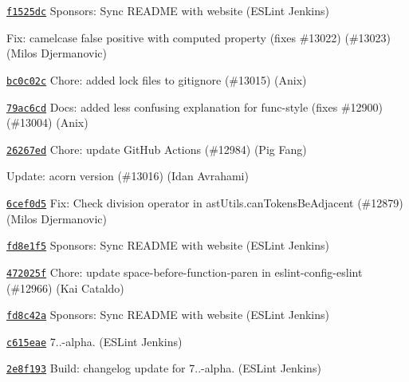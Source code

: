 \begin{DoxyItemize}
\item \href{https://github.com/eslint/eslint/commit/f1525dc45dfdbbe31e724671270785b41cffc6bd}{\texttt{ {\ttfamily f1525dc}}} Sponsors\+: Sync README with website (ESLint Jenkins)
\item \href{https://github.com/eslint/eslint/commit/0243549db4d237cb78e720d55a9cae89b91f6830}{\texttt{ {}}} Fix\+: camelcase false positive with computed property (fixes \#13022) (\#13023) (Milos Djermanovic)
\item \href{https://github.com/eslint/eslint/commit/bc0c02cd0368559c7a7b1510eb4620022a4cc31c}{\texttt{ {\ttfamily bc0c02c}}} Chore\+: added lock files to gitignore (\#13015) (Anix)
\item \href{https://github.com/eslint/eslint/commit/79ac6cd2d8e4c32e03dfea10a957806845058573}{\texttt{ {\ttfamily 79ac6cd}}} Docs\+: added less confusing explanation for func-\/style (fixes \#12900) (\#13004) (Anix)
\item \href{https://github.com/eslint/eslint/commit/26267ed70270ef746b785c09e267f815bf7c596a}{\texttt{ {\ttfamily 26267ed}}} Chore\+: update Git\+Hub Actions (\#12984) (Pig Fang)
\item \href{https://github.com/eslint/eslint/commit/12997058626b5167ba4b9d2ae0d0ea965a01c4be}{\texttt{ {}}} Update\+: acorn version (\#13016) (Idan Avrahami)
\item \href{https://github.com/eslint/eslint/commit/6cef0d50a0d131bc8897799a54e1af1d38606db4}{\texttt{ {\ttfamily 6cef0d5}}} Fix\+: Check division operator in ast\+Utils.\+can\+Tokens\+Be\+Adjacent (\#12879) (Milos Djermanovic)
\item \href{https://github.com/eslint/eslint/commit/fd8e1f52110cada542a120750236fd1ec8779336}{\texttt{ {\ttfamily fd8e1f5}}} Sponsors\+: Sync README with website (ESLint Jenkins)
\item \href{https://github.com/eslint/eslint/commit/472025f2814d0360fe8d4cddbcba049982e1cd43}{\texttt{ {\ttfamily 472025f}}} Chore\+: update space-\/before-\/function-\/paren in eslint-\/config-\/eslint (\#12966) (Kai Cataldo)
\item \href{https://github.com/eslint/eslint/commit/fd8c42ada52f0ae2488ad96ee8fee675f63134ce}{\texttt{ {\ttfamily fd8c42a}}} Sponsors\+: Sync README with website (ESLint Jenkins)
\item \href{https://github.com/eslint/eslint/commit/c615eae0be3c6c167c6f77ec7a73e7adca0ecef0}{\texttt{ {\ttfamily c615eae}}} 7..-\/alpha. (ESLint Jenkins)
\item \href{https://github.com/eslint/eslint/commit/2e8f193ebc970f07ea37d267c8bce02d74c285a8}{\texttt{ {\ttfamily 2e8f193}}} Build\+: changelog update for 7..-\/alpha. (ESLint Jenkins)

\end{DoxyItemize}
